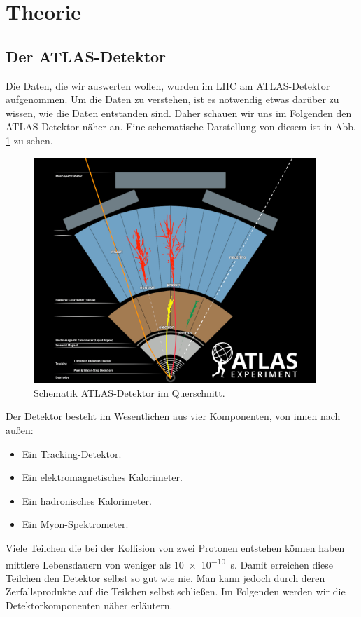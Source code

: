 \section{Theorie}

\subsection{Der ATLAS-Detektor}
Die Daten, die wir auswerten wollen, wurden im LHC am ATLAS-Detektor aufgenommen.
Um die Daten zu verstehen, ist es notwendig etwas darüber zu wissen, wie die Daten entstanden sind.
Daher schauen wir uns im Folgenden den ATLAS-Detektor näher an.
Eine schematische Darstellung von diesem ist in Abb. \ref{ATLAS_schema_label} zu sehen.
\begin{figure}[ht]
\centering
\includegraphics[width=0.95\textwidth]{../Pictures/ATLAS_Detector_Schematic_black_(PNG).png}
\caption{Schematik ATLAS-Detektor im Querschnitt. \cite{ATLAS_schema}}
\label{ATLAS_schema_label}
\end{figure}
Der Detektor besteht im Wesentlichen aus vier Komponenten, von innen nach außen:
\begin{itemize}
\item Ein Tracking-Detektor.
\item Ein elektromagnetisches Kalorimeter.
\item Ein hadronisches Kalorimeter.
\item Ein Myon-Spektrometer.
\end{itemize}
Viele Teilchen die bei der Kollision von zwei Protonen entstehen können haben mittlere Lebensdauern von weniger  als \SI{10e-10}{\second}.
Damit erreichen diese Teilchen den Detektor selbst so gut wie nie.
Man kann jedoch durch deren Zerfallsprodukte auf die Teilchen selbst schließen.
Im Folgenden werden wir die Detektorkomponenten näher erläutern.

